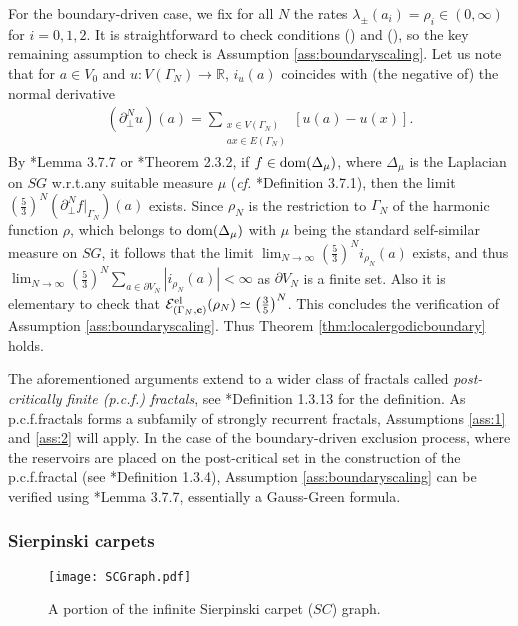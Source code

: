 \documentclass[11pt]{amsart}
\theoremstyle{plain}
\theoremstyle{definition}
\theoremstyle{remark}
\begin{document}
For the boundary-driven case, we fix for all $N$ the rates $\lambda_\pm(a_i) = \rho_i \in (0,\infty)$ for $i=0,1,2$. It is straightforward to check conditions () and (), so the key remaining assumption to check is Assumption \ref{ass:boundaryscaling}. Let us note that for $a\in V_0$ and $u: V(\Gamma_N)\to\mathbb{R}$, $i_u(a)$ coincides with (the negative of) the normal derivative
\begin{align}
(\partial_\perp^N u)(a) = \sum_{\substack{x\in V(\Gamma_N) \\ ax\in E(\Gamma_N)}} [u(a)-u(x)]. 
\end{align}
By \cite{Kigami}*{Lemma 3.7.7} or \cite{StrichartzBook}*{Theorem 2.3.2}, if $f \in {\rm dom}(\Delta_\mu)$, where $\Delta_\mu$ is the Laplacian on $SG$ w.r.t.\@ any suitable measure $\mu$ (\emph{cf.\@} \cite{Kigami}*{Definition 3.7.1}), then the limit $(\frac{5}{3})^N (\partial^N_\perp f|_{\Gamma_N})(a)$ exists. Since $\rho_N$ is the restriction to $\Gamma_N$ of the harmonic function $\rho$, which belongs to ${\rm dom}(\Delta_\mu)$ with $\mu$ being the standard self-similar measure on $SG$, it follows that the limit $\lim_{N\to\infty} (\frac{5}{3})^N i_{\rho_N}(a)$ exists, and thus $\lim_{N\to\infty} (\frac{5}{3})^N \sum_{a \in \partial V_N} |i_{\rho_N}(a)| <\infty$ as $\partial V_N$ is a finite set. Also it is elementary to check that $\mathcal{E}^{\rm el}_{(\Gamma_N,{\bf c})}(\rho_N) \simeq \left(\frac{3}{5}\right)^N$. This concludes the verification of Assumption \ref{ass:boundaryscaling}. Thus Theorem \ref{thm:localergodicboundary} holds.

The aforementioned arguments extend to a wider class of fractals called \emph{post-critically finite (p.c.f.\@) fractals}, see \cite{Kigami}*{Definition 1.3.13} for the definition. As p.c.f.\@ fractals forms a subfamily of strongly recurrent fractals, Assumptions \ref{ass:1} and \ref{ass:2} will apply. In the case of the boundary-driven exclusion process, where the reservoirs are placed on the post-critical set in the construction of the p.c.f.\@ fractal (see \cite{Kigami}*{Definition 1.3.4}), Assumption \ref{ass:boundaryscaling} can be verified using \cite{Kigami}*{Lemma 3.7.7}, essentially a Gauss-Green formula.

\subsubsection{Sierpinski carpets}

\begin{figure}
\centering
\texttt{[image: SCGraph.pdf]}
\caption{A portion of the infinite Sierpinski carpet ($SC$) graph.}
\label{fig:SCGraph}
\end{figure}
\end{document}
